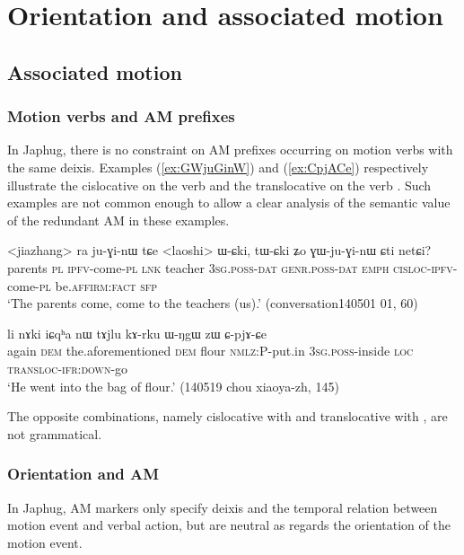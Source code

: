 \chapter{Orientation and associated motion}
\section{Associated motion}

\subsection{Motion verbs and AM prefixes}
In Japhug, there is no constraint on AM prefixes occurring on motion verbs with the same deixis. Examples (\ref{ex:GWjuGinW}) and (\ref{ex:CpjACe}) respectively illustrate the cislocative on the verb  and the translocative on the verb . Such examples are not common enough to allow a clear analysis of the semantic value of the redundant AM in these examples.

\begin{exe}
\ex \label{ex:GWjuGinW}
 \gll <jiazhang> ra ju-ɣi-nɯ tɕe <laoshi> ɯ-ɕki, tɯ-ɕki ʑo ɣɯ-ju-ɣi-nɯ ɕti netɕi? \\
 parents \textsc{pl} \textsc{ipfv}-come-\textsc{pl} \textsc{lnk} teacher \textsc{3sg}.\textsc{poss}-\textsc{dat} \textsc{genr}.\textsc{poss}-\textsc{dat} \textsc{emph} \textsc{cisloc}-\textsc{ipfv}-come-\textsc{pl} be.\textsc{affirm}:\textsc{fact} \textsc{sfp} \\
 \glt `The parents come, come to the teachers (us).' (conversation140501 01, 60)
\end{exe}

\begin{exe}
\ex \label{ex:CpjACe}
 \gll li nɤki iɕqʰa nɯ tɤjlu kɤ-rku ɯ-ŋgɯ zɯ ɕ-pjɤ-ɕe \\
 again \textsc{dem} the.aforementioned \textsc{dem} flour \textsc{nmlz}:P-put.in \textsc{3sg}.\textsc{poss}-inside \textsc{loc} \textsc{transloc}-\textsc{ifr}:\textsc{down}-go \\
 \glt `He went into the bag of flour.' (140519 chou xiaoya-zh, 145)
\end{exe}

The opposite combinations, namely cislocative with  and translocative with , are not grammatical. 

\subsection{Orientation and AM}
In Japhug, AM markers only specify deixis and the temporal relation between motion event and verbal action, but are neutral as regards the orientation of the motion event.

